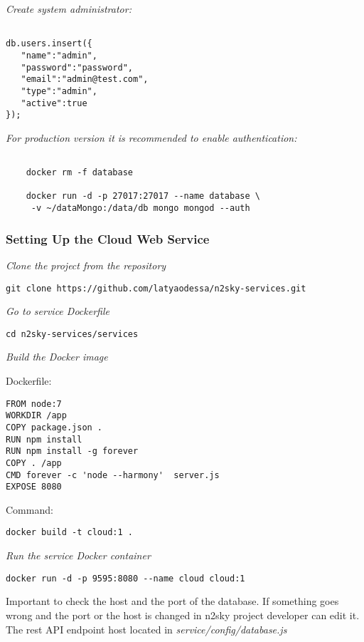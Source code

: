 \emph{Create system administrator:}
 \begin{lstlisting}
 
db.users.insert({
   "name":"admin",
   "password":"password",
   "email":"admin@test.com",
   "type":"admin",
   "active":true
});

\end{lstlisting}


\emph{For production version it is recommended to enable authentication:}
 \begin{lstlisting}
 
 	docker rm -f database
 
	docker run -d -p 27017:27017 --name database \
	 -v ~/dataMongo:/data/db mongo mongod --auth

\end{lstlisting}



\subsubsection{Setting Up the Cloud Web Service}\label{cloud setup}

\emph{Clone the project from the repository}
 \begin{lstlisting}
git clone https://github.com/latyaodessa/n2sky-services.git 
\end{lstlisting}

\emph{Go to service Dockerfile}
 \begin{lstlisting}
cd n2sky-services/services
\end{lstlisting}

\emph{Build the Docker image}

Dockerfile:
 \begin{lstlisting}
FROM node:7
WORKDIR /app
COPY package.json .
RUN npm install
RUN npm install -g forever
COPY . /app
CMD forever -c 'node --harmony'  server.js
EXPOSE 8080
\end{lstlisting}

Command: 
 \begin{lstlisting}
docker build -t cloud:1 .
\end{lstlisting}


\emph{Run the service Docker container}
 \begin{lstlisting}
docker run -d -p 9595:8080 --name cloud cloud:1
\end{lstlisting}


Important to check the host and the port of the database. 
If something goes wrong and the port or the host is changed in n2sky project developer can edit it.
The rest API endpoint host located in \emph{service/config/database.js}

